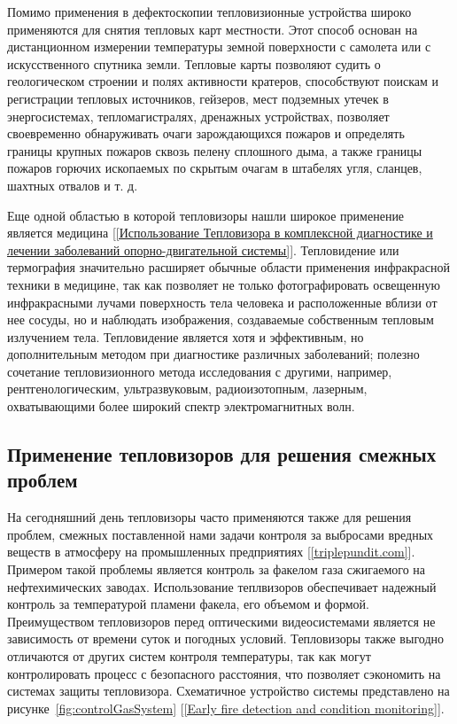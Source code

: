 \documentclass[14pt, a4paper]{extreport}
\begin{document}
	Помимо применения в дефектоскопии тепловизионные устройства широко применяются для снятия тепловых карт местности. Этот способ основан на дистанционном измерении температуры земной поверхности с самолета или с искусственного спутника земли. Тепловые карты позволяют судить о геологическом строении и полях активности кратеров, способствуют поискам и регистрации тепловых источников, гейзеров, мест подземных утечек в энергосистемах, тепломагистралях, дренажных устройствах, позволяет своевременно обнаруживать очаги зарождающихся пожаров и определять границы крупных пожаров сквозь пелену сплошного дыма, а также границы пожаров горючих ископаемых по скрытым очагам в штабелях угля, сланцев, шахтных отвалов и т. д.
	
	Еще одной областью в которой тепловизоры нашли широкое применение является медицина [\ref{Использование Тепловизора в комплексной
		диагностике и лечении заболеваний опорно-двигательной системы}]. Тепловидение или термография значительно расширяет обычные области применения инфракрасной техники в медицине, так как позволяет не только фотографировать освещенную инфракрасными лучами поверхность тела человека и расположенные вблизи от нее сосуды, но и наблюдать изображения, создаваемые собственным тепловым излучением тела. Тепловидение является хотя и эффективным, но дополнительным методом при диагностике различных заболеваний; полезно сочетание тепловизионного метода исследования с другими, например, рентгенологическим, ультразвуковым, радиоизотопным, лазерным, охватывающими более широкий спектр электромагнитных волн.
	
\subsection{Применение тепловизоров для решения смежных проблем}
	На сегодняшний день тепловизоры часто применяются также для решения проблем, смежных поставленной нами задачи контроля за выбросами вредных веществ в атмосферу на промышленных предприятиях [\ref{triplepundit.com}]. Примером такой проблемы является контроль за факелом газа сжигаемого на нефтехимических заводах. Использование теплвизоров обеспечивает надежный контроль за температурой пламени факела, его объемом и формой. Преимуществом тепловизоров перед оптическими видеосистемами является не зависимость от времени суток и погодных условий. Тепловизоры также выгодно отличаются от других систем контроля температуры, так как могут контролировать процесс с безопасного расстояния, что позволяет сэкономить на системах защиты тепловизора. Схематичное устройство системы представлено на рисунке~\ref{fig:controlGasSystem} [\ref{Early fire detection and condition monitoring}].
	
\end{document}
